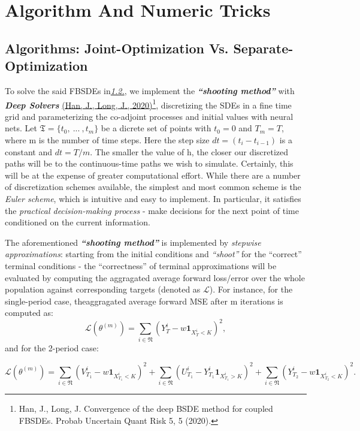 \documentclass{article}
\begin{document}
\section{Algorithm And Numeric
Tricks}

\subsection{Algorithms: Joint-Optimization Vs.
Separate-Optimization}

To solve the said FBSDEs in\protect\hyperlink{rec-market-modeling}{\emph{1.2.}}, we
implement the \textbf{\emph{``shooting method''}} with
\emph{\textbf{Deep Solvers}}
\href{https://doi.org/10.1186/s41546-020-00047-w}{(Han, J., Long, J.,
2020)}\footnote{Han, J., Long, J. Convergence of the deep BSDE method
  for coupled FBSDEs. Probab Uncertain Quant Risk 5, 5 (2020).},
discretizing the SDEs in a fine time grid and parameterizing the
co-adjoint processes and initial values with neural nets. Let
\(\mathfrak{T}=\lbrace{t_0,~...~, t_m \rbrace}\) be a dicrete set of
points with \(t_0=0\) and \(T_m=T\), where m is the number of time
steps. Here the step size \(dt=(t_i-t_{i-1})\) is a constant and
\(dt=T/m\). The smaller the value of h, the closer our discretized paths
will be to the continuous-time paths we wish to simulate. Certainly,
this will be at the expense of greater computational effort. While there
are a number of discretization schemes available, the simplest and most
common scheme is the \emph{Euler scheme}, which is intuitive and easy to
implement. In particular, it satisfies the \emph{practical
decision-making process} - make decisions for the next point of time
conditioned on the current information.

The aforementioned \textbf{\emph{``shooting method''}} is implemented by
\emph{stepwise approximations}: starting from the initial conditions and
\emph{``shoot''} for the ``correct'' terminal conditions - the
``correctness'' of terminal approximations will be evaluated by
computing the aggragated average forward loss/error over the whole
population against corresponding targets (denoted as \(\mathcal{L}\)).
For instance, for the single-period case, theaggragated average forward
MSE after m iterations is computed as: \[
\mathcal{L}(\theta^{(m)})= \sum_{i\in\mathfrak{N}}(Y_{T}^i-w\mathbf{1}_{X_{T}^i<K})^2,
\] and for the 2-period case:

\[
\mathcal{L}(\theta^{(m)})= \sum_{i\in\mathfrak{N}}(V_{T_1}^i-w\mathbf{1}_{X_{T_1}^i<K})^2 + \sum_{i\in\mathfrak{N}}(U_{T_1}^i-Y_{T_1}^i\mathbf{1}_{X_{T_1}^i>K})^2 + \sum_{i\in\mathfrak{N}}(Y_{T_2}^i-w\mathbf{1}_{X_{T_2}^i<K})^2.
\]
\end{document}
